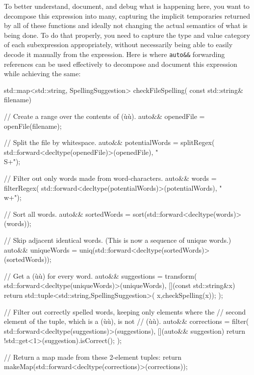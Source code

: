 To better understand, document, and debug what is happening
here, you want to decompose this expression into many, capturing the
implicit temporaries returned by all of these functions and ideally not
changing the actual semantics of what is being done. To do that
properly, you need to capture the type and value category of each
subexpression appropriately, without necessarily being able to easily
decode it manually from the expression. Here is where \texttt{auto\&\&}
forwarding references can be used effectively to decompose and document
this expression while achieving the same:

\begin{emcppslisting}[emcppsbatch=e14]
std::map<std::string, SpellingSuggestion> checkFileSpelling(
                                                   const std::string& filename)
{
    // Create a range over the contents of (ù{}ù).
    auto&& openedFile = openFile(filename);

    // Split the file by whitespace.
    auto&& potentialWords = splitRegex(
        std::forward<decltype(openedFile)>(openedFile), "\\S+");

    // Filter out only words made from word-characters.
    auto&& words = filterRegex(
        std::forward<decltype(potentialWords)>(potentialWords), "\\w+");

    // Sort all words.
    auto&& sortedWords = sort(std::forward<decltype(words)>(words));

    // Skip adjacent identical words. (This is now a sequence of unique words.)
    auto&& uniqueWords = uniq(std::forward<decltype(sortedWords)>(sortedWords));

    // Get a (ù{}ù) for every word.
    auto&& suggestions = transform(
        std::forward<decltype(uniqueWords)>(uniqueWords),
        [](const std::string&x) {
            return std::tuple<std::string,SpellingSuggestion>(
                x,checkSpelling(x));
        });

    // Filter out correctly spelled words, keeping only elements where the
    // second element of the tuple, which is a (ù{}ù), is not
    // (ù{}ù).
    auto&& corrections = filter(
        std::forward<decltype(suggestions)>(suggestions),
        [](auto&& suggestion){ return !std::get<1>(suggestion).isCorrect(); });

    // Return a map made from these 2-element tuples:
    return makeMap(std::forward<decltype(corrections)>(corrections));
}
\end{emcppslisting}

